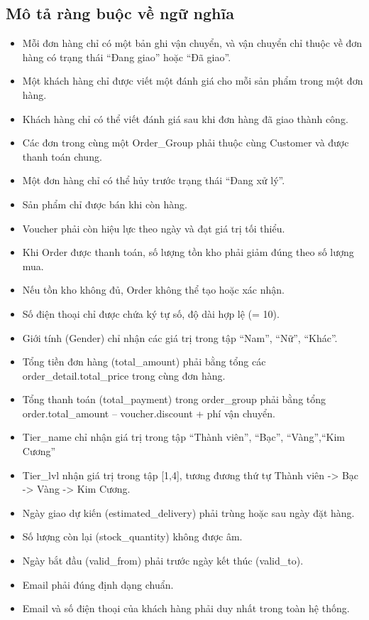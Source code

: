 \subsection{Mô tả ràng buộc về ngữ nghĩa}
\begin{itemize}
    \item Mỗi đơn hàng chỉ có một bản ghi vận chuyển, và vận chuyển chỉ thuộc về đơn hàng có trạng thái “Đang giao” hoặc “Đã giao”.
    \item Một khách hàng chỉ được viết một đánh giá cho mỗi sản phẩm trong một đơn hàng.
    \item Khách hàng chỉ có thể viết đánh giá sau khi đơn hàng đã giao thành công.
    \item Các đơn trong cùng một Order\_Group phải thuộc cùng Customer và được thanh toán chung.
    \item Một đơn hàng chỉ có thể hủy trước trạng thái “Đang xử lý”.
    \item Sản phẩm chỉ được bán khi còn hàng.
    \item Voucher phải còn hiệu lực theo ngày và đạt giá trị tối thiểu.
    \item Khi Order được thanh toán, số lượng tồn kho phải giảm đúng theo số lượng mua.
    \item Nếu tồn kho không đủ, Order không thể tạo hoặc xác nhận.
    \item Số điện thoại chỉ được chứa ký tự số, độ dài hợp lệ (= 10).
    \item Giới tính (Gender) chỉ nhận các giá trị trong tập {“Nam”, “Nữ”, “Khác”}.
    \item Tổng tiền đơn hàng (total\_amount) phải bằng tổng các order\_detail.total\_price trong cùng đơn hàng.
    \item Tổng thanh toán (total\_payment) trong order\_group phải bằng tổng order.total\_amount – voucher.discount + phí vận chuyển.
    \item Tier\_name chỉ nhận giá trị trong tập {“Thành viên”, “Bạc”, “Vàng”,“Kim Cương”}
    \item Tier\_lvl nhận giá trị trong tập [1,4], tương đương thứ tự Thành viên -> Bạc -> Vàng -> Kim Cương.
    \item Ngày giao dự kiến (estimated\_delivery) phải trùng hoặc sau ngày đặt hàng.
    \item Số lượng còn lại (stock\_quantity) không được âm.
    \item Ngày bắt đầu (valid\_from) phải trước ngày kết thúc (valid\_to).
    \item Email phải đúng định dạng chuẩn.
    \item Email và số điện thoại của khách hàng phải duy nhất trong toàn hệ thống.
\end{itemize}